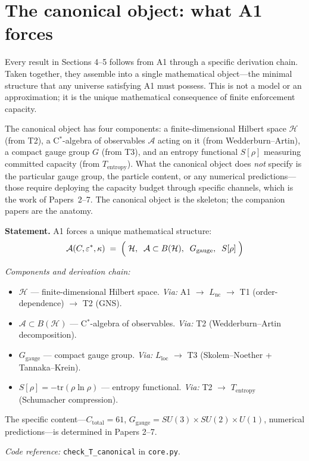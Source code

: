 \documentclass[11pt]{article}
\newenvironment{varlist}{\begin{itemize}[nosep,leftmargin=2em]}{\end{itemize}}
\newcommand{\coderef}[2]{\smallskip\noindent\textit{Code reference:} \texttt{#1} in \texttt{#2}.}
\begin{document}
\section{The canonical object: what A1 forces}

Every result in Sections 4--5 follows from A1 through a specific derivation chain.  Taken together, they assemble into a single mathematical object---the minimal structure that any universe satisfying A1 must possess.  This is not a model or an approximation; it is the unique mathematical consequence of finite enforcement capacity.

The canonical object has four components: a finite-dimensional Hilbert space $\mathcal{H}$ (from T2), a C$^*$-algebra of observables $\mathcal{A}$ acting on it (from Wedderburn--Artin), a compact gauge group $G$ (from T3), and an entropy functional $S[\rho]$ measuring committed capacity (from $T_{\mathrm{entropy}}$).  What the canonical object does \emph{not} specify is the particular gauge group, the particle content, or any numerical predictions---those require deploying the capacity budget through specific channels, which is the work of Papers~2--7.  The canonical object is the skeleton; the companion papers are the anatomy.

\begin{tcolorbox}[apfbox, title={$T_{\mathrm{canonical}}$: The Canonical Object Forced by A1}]
\textbf{Statement.}  A1 forces a unique mathematical structure:
\begin{equation}
\mathcal{A}(C, \varepsilon^*, \kappa) \;=\; \Bigl(\;\mathcal{H},\;\; \mathcal{A} \subset B(\mathcal{H}),\;\; G_{\mathrm{gauge}},\;\; S[\rho]\;\Bigr)
\end{equation}

\smallskip\noindent\textit{Components and derivation chain:}
\begin{varlist}
\item $\mathcal{H}$ --- finite-dimensional Hilbert space. \textit{Via:} A1 $\to$ $L_{\mathrm{nc}}$ $\to$ T1 (order-dependence) $\to$ T2 (GNS).
\item $\mathcal{A} \subset B(\mathcal{H})$ --- C$^*$-algebra of observables. \textit{Via:} T2 (Wedderburn--Artin decomposition).
\item $G_{\mathrm{gauge}}$ --- compact gauge group. \textit{Via:} $L_{\mathrm{loc}}$ $\to$ T3 (Skolem--Noether + Tannaka--Krein).
\item $S[\rho] = -\mathrm{tr}(\rho \ln \rho)$ --- entropy functional. \textit{Via:} T2 $\to$ $T_{\mathrm{entropy}}$ (Schumacher compression).
\end{varlist}

\smallskip
The specific content---$C_{\mathrm{total}} = 61$, $G_{\mathrm{gauge}} = SU(3) \times SU(2) \times U(1)$, numerical predictions---is determined in Papers 2--7.

\coderef{check\_T\_canonical}{core.py}
\end{tcolorbox}
\end{document}
